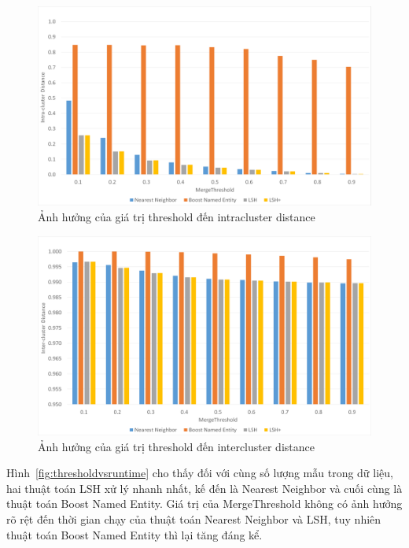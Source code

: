 		\begin{figure}
			\includegraphics[width=0.9\linewidth]{Chapter4/Chapter4Figs/MergeThresholdVSIntraDistance}
			\caption{Ảnh hưởng của giá trị threshold đến intracluster distance}
			\label{fig:thresholdvslocal}
		\end{figure}
		
		\begin{figure}[H]
			\includegraphics[width=0.9\linewidth]{Chapter4/Chapter4Figs/MergeThresholdVSInterDistance}
			\caption{Ảnh hưởng của giá trị threshold đến intercluster distance}
			\label{fig:thresholdvsglobal}
		\end{figure}
	
	Hình~\ref{fig:thresholdvsruntime} cho thấy đối với cùng số lượng mẫu trong dữ liệu, hai thuật toán LSH xử lý nhanh nhất, kế đến là Nearest Neighbor và cuối cùng là thuật toán Boost Named Entity. Giá trị của MergeThreshold không có ảnh hưởng rõ rệt đến thời gian chạy của thuật toán Nearest Neighbor và LSH, tuy nhiên thuật toán Boost Named Entity thì lại tăng đáng kể. 
	
